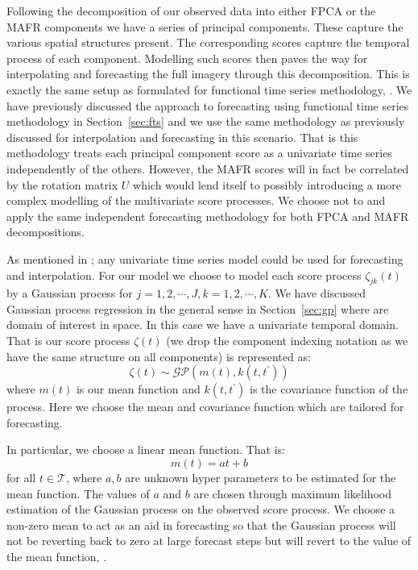 Following the decomposition of our observed data into either FPCA or the MAFR components we have a series of principal components. 
These capture the various spatial structures present.
The corresponding scores capture the temporal process of each component.
Modelling such scores then paves the way for interpolating and forecasting the full imagery through this decomposition.
This is exactly the same setup as formulated for functional time series methodology, \citep{hyndman_forecasting_2009}.
We have previously discussed the approach to forecasting using functional time series methodology in Section~\ref{sec:fts} and we use the same methodology as previously discussed for interpolation and forecasting in this scenario.
That is this methodology treats each principal component score as a univariate time series independently of the others.
However, the MAFR scores will in fact be correlated by the rotation matrix $U$ which would lend itself to possibly introducing a more complex modelling of the multivariate score processes.
We choose not to and apply the same independent forecasting methodology for both FPCA and MAFR decompositions. 

As mentioned in \citep{hyndman_forecasting_2009}; any univariate time series model could be used for forecasting and interpolation. 
For our model we choose to model each score process $\zeta_{jk}(t)$ by a Gaussian process for $j=1,2,\cdots, J, k=1,2,\cdots,K$.
We have discussed Gaussian process regression in the general sense in Section~\ref{sec:gp} where are domain of interest in space.
In this case we have a univariate temporal domain. 
That is our score process $\zeta(t)$ (we drop the component indexing notation as we have the same structure on all components) is represented as:
\begin{equation}
	\zeta(t) \sim \mathcal{GP}\left( m(t), k(t, t^\prime)\right)
\end{equation}
where $m(t)$ is our mean function and $k(t, t^\prime)$ is the covariance function of the process.
Here we choose the mean and covariance function which are tailored for forecasting.

In particular, we choose a linear mean function.
That is:
\begin{equation}
	m(t) = at + b
\end{equation}
for all $t \in \mathcal{T}$, where $a, b$ are unknown hyper parameters to be estimated for the mean function.
The values of $a$ and $b$ are chosen through maximum likelihood estimation of the Gaussian process on the observed score process. 
We choose a non-zero mean to act as an aid in forecasting so that the Gaussian process will not be reverting back to zero at large forecast steps but will revert to the value of the mean function, \citep{williams_gaussian_2006}. 

